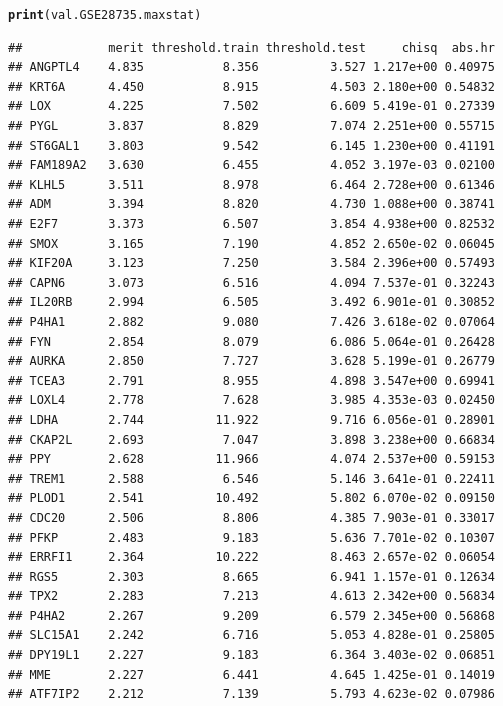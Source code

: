 \documentclass{article}\usepackage[]{graphicx}\usepackage[]{color}
\makeatletter
\newcommand{\hlstd}[1]{\textcolor[rgb]{0.345,0.345,0.345}{#1}}%
\newcommand{\hlkwd}[1]{\textcolor[rgb]{0.737,0.353,0.396}{\textbf{#1}}}%
\newenvironment{kframe}{%
 \def\at@end@of@kframe{}%
 \ifinner\ifhmode%
  \def\at@end@of@kframe{\end{minipage}}%
  \begin{minipage}{\columnwidth}%
 \fi\fi%
 \def\FrameCommand##1{\hskip\@totalleftmargin \hskip-\fboxsep
 \colorbox{shadecolor}{##1}\hskip-\fboxsep
     \hskip-\linewidth \hskip-\@totalleftmargin \hskip\columnwidth}%
 \MakeFramed {\advance\hsize-\width
   \@totalleftmargin\z@ \linewidth\hsize
   \@setminipage}}%
 {\par\unskip\endMakeFramed%
 \at@end@of@kframe}
\newenvironment{knitrout}{}{} %
\makeatother
\begin{document}
\begin{knitrout}
\begin{kframe}
\begin{verbatim}
\end{verbatim}
\begin{alltt}
\hlkwd{print}\hlstd{(val.GSE28735.maxstat)}
\end{alltt}
\begin{verbatim}
##            merit threshold.train threshold.test     chisq  abs.hr
## ANGPTL4    4.835           8.356          3.527 1.217e+00 0.40975
## KRT6A      4.450           8.915          4.503 2.180e+00 0.54832
## LOX        4.225           7.502          6.609 5.419e-01 0.27339
## PYGL       3.837           8.829          7.074 2.251e+00 0.55715
## ST6GAL1    3.803           9.542          6.145 1.230e+00 0.41191
## FAM189A2   3.630           6.455          4.052 3.197e-03 0.02100
## KLHL5      3.511           8.978          6.464 2.728e+00 0.61346
## ADM        3.394           8.820          4.730 1.088e+00 0.38741
## E2F7       3.373           6.507          3.854 4.938e+00 0.82532
## SMOX       3.165           7.190          4.852 2.650e-02 0.06045
## KIF20A     3.123           7.250          3.584 2.396e+00 0.57493
## CAPN6      3.073           6.516          4.094 7.537e-01 0.32243
## IL20RB     2.994           6.505          3.492 6.901e-01 0.30852
## P4HA1      2.882           9.080          7.426 3.618e-02 0.07064
## FYN        2.854           8.079          6.086 5.064e-01 0.26428
## AURKA      2.850           7.727          3.628 5.199e-01 0.26779
## TCEA3      2.791           8.955          4.898 3.547e+00 0.69941
## LOXL4      2.778           7.628          3.985 4.353e-03 0.02450
## LDHA       2.744          11.922          9.716 6.056e-01 0.28901
## CKAP2L     2.693           7.047          3.898 3.238e+00 0.66834
## PPY        2.628          11.966          4.074 2.537e+00 0.59153
## TREM1      2.588           6.546          5.146 3.641e-01 0.22411
## PLOD1      2.541          10.492          5.802 6.070e-02 0.09150
## CDC20      2.506           8.806          4.385 7.903e-01 0.33017
## PFKP       2.483           9.183          5.636 7.701e-02 0.10307
## ERRFI1     2.364          10.222          8.463 2.657e-02 0.06054
## RGS5       2.303           8.665          6.941 1.157e-01 0.12634
## TPX2       2.283           7.213          4.613 2.342e+00 0.56834
## P4HA2      2.267           9.209          6.579 2.345e+00 0.56868
## SLC15A1    2.242           6.716          5.053 4.828e-01 0.25805
## DPY19L1    2.227           9.183          6.364 3.403e-02 0.06851
## MME        2.227           6.441          4.645 1.425e-01 0.14019
## ATF7IP2    2.212           7.139          5.793 4.623e-02 0.07986

\end{verbatim}
\end{kframe}
\end{knitrout}
\end{document}

